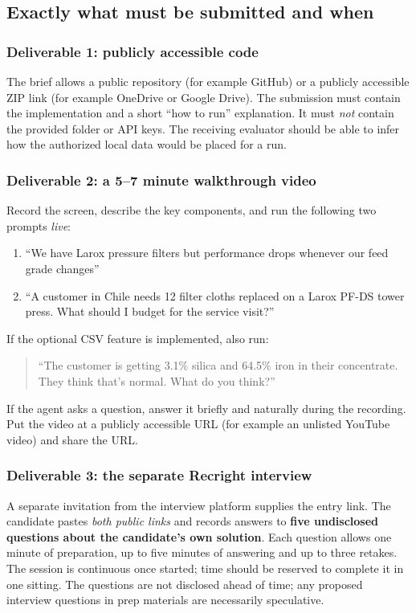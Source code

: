 \documentclass[11pt,a4paper]{article}
\DeclareRobustCommand{\code}[1]{{\ttfamily\small\detokenize{#1}}}
\newcommand{\term}[1]{\textbf{#1}}
\begin{document}
\subsection{Exactly what must be submitted and when}
\subsubsection{Deliverable 1: publicly accessible code}
The brief allows a public repository (for example GitHub) or a publicly accessible ZIP link (for example OneDrive or Google Drive). The submission must contain the implementation and a short ``how to run'' explanation. It must \emph{not} contain the provided \code{data/} folder or API keys. The receiving evaluator should be able to infer how the authorized local data would be placed for a run.

\subsubsection{Deliverable 2: a 5--7 minute walkthrough video}
Record the screen, describe the key components, and run the following two prompts \emph{live}:
\begin{enumerate}
\item ``We have Larox pressure filters but performance drops whenever our feed grade changes''
\item ``A customer in Chile needs 12 filter cloths replaced on a Larox PF-DS tower press. What should I budget for the service visit?''
\end{enumerate}
If the optional CSV feature is implemented, also run:
\begin{quote}
``The customer is getting 3.1\% silica and 64.5\% iron in their concentrate. They think that's normal. What do you think?''
\end{quote}
If the agent asks a question, answer it briefly and naturally during the recording. Put the video at a publicly accessible URL (for example an unlisted YouTube video) and share the URL.

\subsubsection{Deliverable 3: the separate Recright interview}
A separate invitation from the interview platform supplies the entry link. The candidate pastes \emph{both public links} and records answers to \term{five undisclosed questions about the candidate's own solution}. Each question allows one minute of preparation, up to five minutes of answering and up to three retakes. The session is continuous once started; time should be reserved to complete it in one sitting. The questions are not disclosed ahead of time; any proposed interview questions in prep materials are necessarily speculative.
\end{document}
